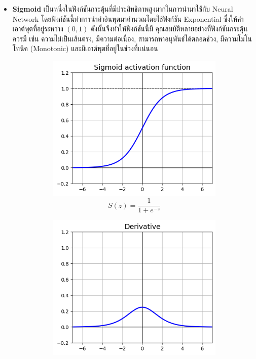 \begin{itemize}
    \item \textbf{Sigmoid}\autocite{wilson1972} เป็นหนึ่งในฟังก์ชันกระตุ้นที่มีประสิทธิภาพสูงมากในการนำมาใช้กับ Neural Network 
    โดยฟังก์ชันนี้ทำการนำค่าอินพุตมาคำนวณโดยใช้ฟังก์ชัน Exponential ซึ่งให้ค่าเอาต์พุตที่อยู่ระหว่าง $(0, 1)$ ดังนั้นจึงทำให้ฟังก์ชันนี้มี%
    คุณสมบัติหลายอย่างที่ฟังก์ชันกระตุ้นควรมี เช่น ความไม่เป็นเส้นตรง, มีความต่อเนื่อง, สามารถหาอนุพันธ์ได้ตลอดช่วง, มีความโมโนโทนิค 
    (Monotonic) และมีเอาต์พุตที่อยู่ในช่วงที่แน่นอน
    \begin{figure}[H]
        \centering
        \begin{subfigure}{0.5\textwidth}
            \centering
            \includegraphics[width=0.9\linewidth]{fig/actfunc_sigmoid.png}
            \caption{%
                \begin{equation}
                    S(z) = \frac{1} {1 + e^{-z}}
                \end{equation}
            }
            \label{fig:actfunc_sigmoid}
        \end{subfigure}%
        \begin{subfigure}{0.5\textwidth}
            \centering
            \includegraphics[width=0.9\linewidth]{fig/actfunc_sigmoid_der.png}

\end{subfigure}
\end{figure}
\end{itemize}

